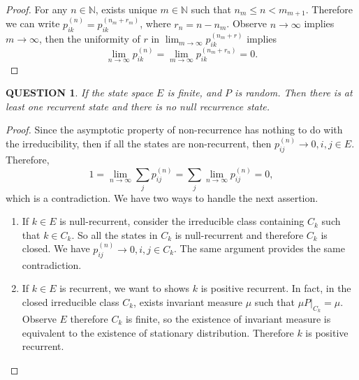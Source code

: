 \documentclass[12pt]{article}
\renewcommand{\(}{\left(}%
\renewcommand{\)}{\right)}%
\renewcommand{\[}{\left[}%
\renewcommand{\]}{\right]}%
\newcommand{\n}{\mathbb{N}}
\newtheorem{question}{QUESTION}[section]}
\newtheorem{proof}{Proof.}}
\begin{document}
\begin{proof}
  	For any $n\in\n$, exists unique $m\in\n$ such that $n_m\leq n<m_{m+1}$. Therefore we can write $p_{ik}^{(n)}=p_{ik}^{(n_m+r_m)}$, where $r_n=n-n_m$. Observe $n\to\infty$ implies $m\to\infty$, then the uniformity of $r$ in $\lim_{m\to\infty}p_{ik}^{(n_m+r)}$ implies 
  	\begin{equation*}
  		\lim_{n\to\infty}p_{ik}^{(n)}=\lim_{m\to\infty}p_{ik}^{(n_m+r_n)}=0.
  	\end{equation*}
  \end{proof}
  
  \begin{question}
  	If the state space $E$ is finite, and $P$ is random. Then there is at least one recurrent state and there is no null recurrence state.
  \end{question}
  \begin{proof}
  	Since the asymptotic property of non-recurrence has nothing to do with the irreducibility, then if all the states are non-recurrent, then $p_{ij}^{(n)}\to0,i,j\in E$. Therefore,
  	\begin{equation*}
  		1=\lim_{n\to\infty}\sum_jp_{ij}^{(n)}=\sum_j\lim_{n\to\infty}p_{ij}^{(n)}=0,
  	\end{equation*}
  	which is a contradiction. We have two ways to handle the next assertion.
  	\begin{enumerate}
  		\item If $k\in E$ is null-recurrent, consider the irreducible class containing $C_k$ such that $k\in C_k$. So all the states in $C_k$ is null-recurrent and therefore $C_k$ is closed. We have $p_{ij}^{(n)}\to0,i,j\in C_k$. The same argument provides the same contradiction.
  		\item If $k\in E$ is recurrent, we want to shows $k$ is positive recurrent. In fact, in the closed irreducible class $C_k$, exists invariant measure $\mu$ such that $\mu P|_{C_k}=\mu$. Observe $E$ therefore $C_k$ is finite, so the existence of invariant measure is equivalent to the existence of stationary distribution. Therefore $k$ is positive recurrent.
  	\end{enumerate}
  \end{proof}
  
\end{document}

